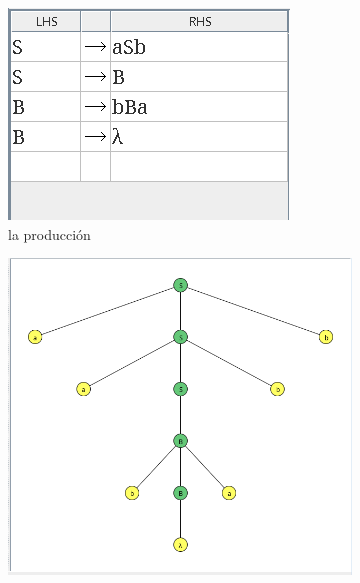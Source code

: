 \documentclass{article}
\begin{document}
\begin{flushleft}
\begin{enumerate}
                \begin{figure}[h] 
                    \centering
                    \begin{subfigure}[b]{0.4\textwidth}
                        \centering
                        \includegraphics[width=\textwidth]{./Imagenes/produccion2.png}
                        \caption{la producción}
                        \label{fig:label5}
                    \end{subfigure}
                    \hfill
                    \begin{subfigure}[b]{0.4\textwidth}
                        \centering
                        \includegraphics[width=\textwidth]{./Imagenes/grafo1.png}

\end{subfigure}
\end{figure}
\end{enumerate}
\end{flushleft}
\end{document}
